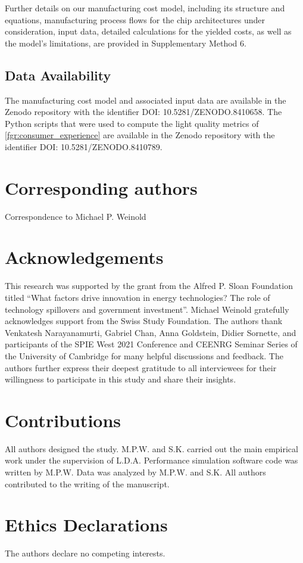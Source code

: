\documentclass[parskip=full]{article}
\begin{document}
Further details on our manufacturing cost model, including its structure and equations, manufacturing process flows for the chip architectures under consideration, input data, detailed calculations for the yielded costs, as well as the model’s limitations, are provided in Supplementary Method 6.

\subsection{Data Availability}

The manufacturing cost model and associated input data are available in the Zenodo repository with the identifier DOI: 10.5281/ZENODO.8410658. The Python scripts that were used to compute the light quality metrics of \cref{fgr:consumer_experience} are available in the Zenodo repository with the identifier DOI: 10.5281/ZENODO.8410789.

\section*{Corresponding authors}
Correspondence to Michael P. Weinold

\section*{Acknowledgements}

This research was supported by the grant from the Alfred P. Sloan Foundation titled “What factors drive innovation in energy technologies? The role of technology spillovers and government investment”. Michael Weinold gratefully acknowledges support from the Swiss Study Foundation. The authors thank Venkatesh Narayanamurti, Gabriel Chan, Anna Goldstein, Didier Sornette, and participants of the SPIE West 2021 Conference and CEENRG Seminar Series of the University of Cambridge for many helpful discussions and feedback. The authors further express their deepest gratitude to all interviewees for their willingness to participate in this study and share their insights.

\section*{Contributions}
All authors designed the study. M.P.W. and S.K. carried out the main empirical work under the supervision of L.D.A. Performance simulation software code was written by M.P.W. Data was analyzed by M.P.W. and S.K. All authors contributed to the writing of the manuscript.

\section*{Ethics Declarations}
The authors declare no competing interests.

\newpage
\printbibliography
\end{document}

